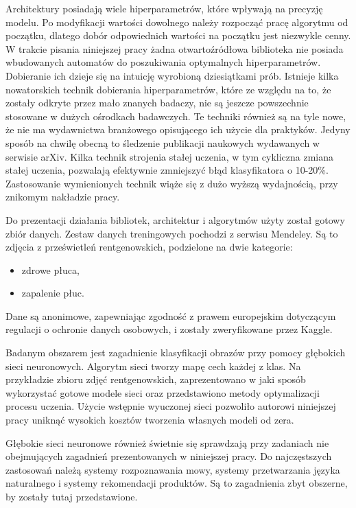 \documentclass[12pt,a4paper,twoside,titlepage,openright]{book}
\begin{document}
Architektury posiadają wiele hiperparametrów, które wpływają na precyzję modelu. Po modyfikacji wartości dowolnego należy rozpocząć pracę algorytmu od początku, dlatego dobór odpowiednich wartości na początku jest niezwykle cenny. W trakcie pisania niniejszej pracy żadna otwartoźródłowa biblioteka nie posiada wbudowanych automatów do poszukiwania optymalnych hiperparametrów. Dobieranie ich dzieje się na intuicję wyrobioną dziesiątkami prób. Istnieje kilka nowatorskich technik dobierania hiperparametrów, które ze względu na to, że zostały odkryte przez mało znanych badaczy, nie są jeszcze powszechnie stosowane w dużych ośrodkach badawczych. Te techniki również są na tyle nowe, że nie ma wydawnictwa branżowego opisującego ich użycie dla praktyków. Jedyny sposób na chwilę obecną to śledzenie publikacji naukowych wydawanych w serwisie arXiv. Kilka technik strojenia stałej uczenia, w tym cykliczna zmiana stałej uczenia, pozwalają efektywnie zmniejszyć błąd klasyfikatora o 10-20\%. Zastosowanie wymienionych technik wiąże się z dużo wyższą wydajnością, przy znikomym nakładzie pracy. 

Do prezentacji działania bibliotek, architektur i algorytmów użyty został gotowy zbiór danych. Zestaw danych treningowych pochodzi z serwisu Mendeley. Są to zdjęcia z prześwietleń rentgenowskich, podzielone na dwie kategorie:
\begin{itemize}
\item zdrowe płuca,
\item zapalenie płuc.
\end{itemize} 

Dane są anonimowe, zapewniając zgodność z prawem europejskim dotyczącym regulacji o ochronie danych osobowych, i zostały zweryfikowane przez Kaggle.\cite{siteMendeley}

Badanym obszarem jest zagadnienie klasyfikacji obrazów przy pomocy głębokich sieci neuronowych. Algorytm sieci tworzy mapę cech każdej z klas. Na przykładzie zbioru zdjęć rentgenowskich, zaprezentowano w jaki sposób wykorzystać gotowe modele sieci oraz przedstawiono metody optymalizacji procesu uczenia. Użycie wstępnie wyuczonej sieci pozwoliło autorowi niniejszej pracy uniknąć wysokich kosztów tworzenia własnych modeli od zera.

Głębokie sieci neuronowe również świetnie się sprawdzają przy zadaniach nie obejmujących zagadnień prezentowanych w niniejszej pracy. Do najczęstszych zastosowań należą systemy rozpoznawania mowy, systemy przetwarzania języka naturalnego i systemy rekomendacji produktów. Są to zagadnienia zbyt obszerne, by zostały tutaj przedstawione.
\end{document}
